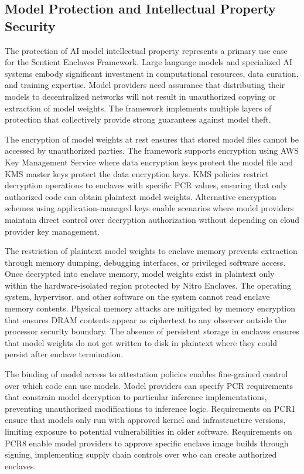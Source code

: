 \subsection{Model Protection and Intellectual Property Security}

The protection of AI model intellectual property represents a primary use case for the Sentient Enclaves Framework. Large language models and specialized AI systems embody significant investment in computational resources, data curation, and training expertise. Model providers need assurance that distributing their models to decentralized networks will not result in unauthorized copying or extraction of model weights. The framework implements multiple layers of protection that collectively provide strong guarantees against model theft.

The encryption of model weights at rest ensures that stored model files cannot be accessed by unauthorized parties. The framework supports encryption using AWS Key Management Service where data encryption keys protect the model file and KMS master keys protect the data encryption keys. KMS policies restrict decryption operations to enclaves with specific PCR values, ensuring that only authorized code can obtain plaintext model weights. Alternative encryption schemes using application-managed keys enable scenarios where model providers maintain direct control over decryption authorization without depending on cloud provider key management.

The restriction of plaintext model weights to enclave memory prevents extraction through memory dumping, debugging interfaces, or privileged software access. Once decrypted into enclave memory, model weights exist in plaintext only within the hardware-isolated region protected by Nitro Enclaves. The operating system, hypervisor, and other software on the system cannot read enclave memory contents. Physical memory attacks are mitigated by memory encryption that ensures DRAM contents appear as ciphertext to any observer outside the processor security boundary. The absence of persistent storage in enclaves ensures that model weights do not get written to disk in plaintext where they could persist after enclave termination.

The binding of model access to attestation policies enables fine-grained control over which code can use models. Model providers can specify PCR requirements that constrain model decryption to particular inference implementations, preventing unauthorized modifications to inference logic. Requirements on PCR1 ensure that models only run with approved kernel and infrastructure versions, limiting exposure to potential vulnerabilities in older software. Requirements on PCR8 enable model providers to approve specific enclave image builds through signing, implementing supply chain controls over who can create authorized enclaves.

